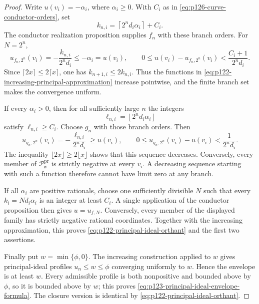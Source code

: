 \begin{proof}
Write \(u(v_i)=-\alpha_i\), where \(\alpha_i\geq0\).  With \(C_i\) as in
\eqref{eq:p126-curve-conductor-orders}, set
\[
 k_{n,i}=\left\lceil2^nd_i\alpha_i\right\rceil+C_i.
 \]
The conductor realization proposition supplies \(f_n\) with these branch
orders.  For \(N=2^n\),
\[
 u_{f_n,2^n}(v_i)=-\frac{k_{n,i}}{2^nd_i}\leq-\alpha_i=u(v_i),
 \qquad
 0\leq u(v_i)-u_{f_n,2^n}(v_i)
       <\frac{C_i+1}{2^nd_i}.
 \tag{\(\ddagger\)}\label{eq:p122-increasing-principal-approximation}
\]
Since \(\lceil2x\rceil\leq2\lceil x\rceil\), one has
\(k_{n+1,i}\leq2k_{n,i}\).  Thus the functions in
\eqref{eq:p122-increasing-principal-approximation} increase pointwise, and
the finite branch set makes the convergence uniform.

If every \(\alpha_i>0\), then for all sufficiently large \(n\) the integers
\[
                    \ell_{n,i}=\left\lfloor2^nd_i\alpha_i\right\rfloor
\]
satisfy \(\ell_{n,i}\geq C_i\).  Choose \(g_n\) with those branch orders.
Then
\[
 u_{g_n,2^n}(v_i)=-\frac{\ell_{n,i}}{2^nd_i}\geq u(v_i),
 \qquad
 0\leq u_{g_n,2^n}(v_i)-u(v_i)<\frac1{2^nd_i}.
\]
The inequality \(\lfloor2x\rfloor\geq2\lfloor x\rfloor\) shows that this
sequence decreases.  Conversely, every member of
\(\mathscr P_{\mathfrak a}^{\mathrm{pr}}\) is strictly negative at every
\(v_i\).  A decreasing sequence starting with such a function therefore
cannot have limit zero at any branch.

If all \(\alpha_i\) are positive rationals, choose one sufficiently
divisible \(N\) such that every \(k_i=Nd_i\alpha_i\) is an integer at least
\(C_i\).  A single application of the conductor proposition then gives
\(u=u_{f,N}\).  Conversely, every member of the displayed family has
strictly negative rational coordinates.  Together with the increasing
approximation, this proves
\eqref{eq:p122-principal-ideal-orthant} and the first two assertions.

Finally put \(w=\min\{\phi,0\}\).  The increasing construction applied to
\(w\) gives principal-ideal profiles \(u_n\leq w\leq\phi\) converging
uniformly to \(w\).  Hence the envelope is at least \(w\).  Every admissible
profile is both nonpositive and bounded above by \(\phi\), so it is bounded
above by \(w\); this proves
\eqref{eq:p123-principal-ideal-envelope-formula}.  The closure version is
identical by \eqref{eq:p122-principal-ideal-orthant}.
\end{proof}
